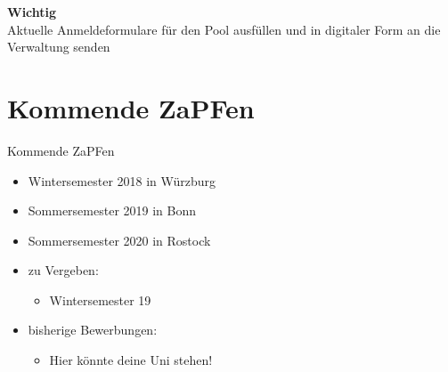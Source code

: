 \documentclass[compress, aspectratio=169]{beamer}
\begin{document}
\begin{frame}
  \begin{framed}
    \begin{center}
      {\Huge \textbf{Wichtig}}\\
      \vspace{0.5cm}
      {\Large Aktuelle Anmeldeformulare für den Pool ausfüllen und in digitaler Form an die Verwaltung senden}
      \end{center}
      \end{framed}
\end{frame}



\section{Kommende ZaPFen}
\begin{frame}{Kommende ZaPFen}
  \begin{itemize}
    \item Wintersemester 2018 in Würzburg
    \item Sommersemester 2019 in Bonn
    \item Sommersemester 2020 in Rostock
    \item zu Vergeben:
      \begin{itemize}
      \item Wintersemester 19
      \end{itemize}
    \item bisherige Bewerbungen:
      \begin{itemize}
      \item Hier könnte deine Uni stehen!
      \end{itemize}
    \end{itemize}
\end{frame}
\end{document}

